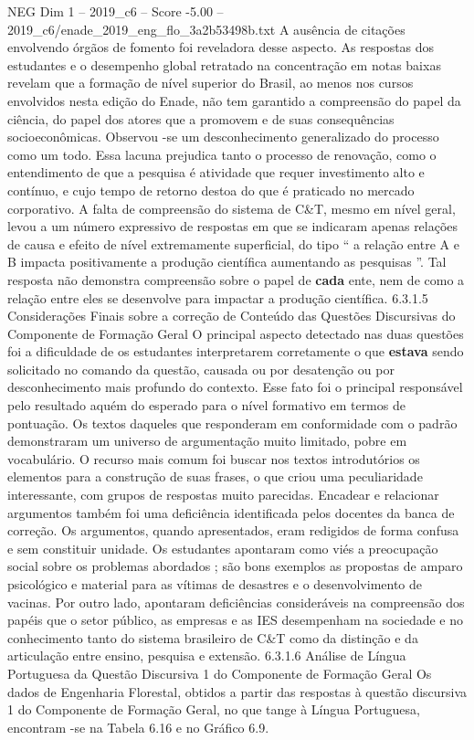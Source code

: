 \begin{textsample}{NEG Dim 1 – 2019\_c6 – Score -5.00 – 2019\_c6/enade\_2019\_eng\_flo\_3a2b53498b.txt}
A ausência de citações envolvendo órgãos de fomento foi reveladora desse aspecto.
As respostas dos estudantes e o desempenho global retratado na concentração em notas baixas revelam que a formação de nível superior do Brasil, ao menos nos cursos envolvidos nesta edição do Enade, não tem garantido a compreensão do papel da ciência, do papel dos atores que a promovem e de suas consequências socioeconômicas.
Observou -se um desconhecimento generalizado do processo como um todo.
Essa lacuna prejudica tanto o processo de renovação, como o entendimento de que a pesquisa é atividade que requer investimento alto e contínuo, e cujo tempo de retorno destoa do que é praticado no mercado corporativo.
A falta de compreensão do sistema de C\&T, mesmo em nível geral, levou a um número expressivo de respostas em que se indicaram apenas relações de causa e efeito de nível extremamente superficial, do tipo “ a relação entre A e B impacta positivamente a produção científica aumentando as pesquisas ”.
Tal resposta não demonstra compreensão sobre o papel de \textbf{cada} ente, nem de como a relação entre eles se desenvolve para impactar a produção científica. 6.3.1.5 Considerações Finais sobre a correção de Conteúdo das Questões Discursivas do Componente de Formação Geral O principal aspecto detectado nas duas questões foi a dificuldade de os estudantes interpretarem corretamente o que \textbf{estava} sendo solicitado no comando da questão, causada ou por desatenção ou por desconhecimento mais profundo do contexto.
Esse fato foi o principal responsável pelo resultado aquém do esperado para o nível formativo em termos de pontuação.
Os textos daqueles que responderam em conformidade com o padrão demonstraram um universo de argumentação muito limitado, pobre em vocabulário.
O recurso mais comum foi buscar nos textos introdutórios os elementos para a construção de suas frases, o que criou uma peculiaridade interessante, com grupos de respostas muito parecidas.
Encadear e relacionar argumentos também foi uma deficiência identificada pelos docentes da banca de correção.
Os argumentos, quando apresentados, eram redigidos de forma confusa e sem constituir unidade.
Os estudantes apontaram como viés a preocupação social sobre os problemas abordados ; são bons exemplos as propostas de amparo psicológico e material para as vítimas de desastres e o desenvolvimento de vacinas.
Por outro lado, apontaram deficiências consideráveis na compreensão dos papéis que o setor público, as empresas e as IES desempenham na sociedade e no conhecimento tanto do sistema brasileiro de C\&T como da distinção e da articulação entre ensino, pesquisa e extensão. 6.3.1.6 Análise de Língua Portuguesa da Questão Discursiva 1 do Componente de Formação Geral Os dados de Engenharia Florestal, obtidos a partir das respostas à questão discursiva 1 do Componente de Formação Geral, no que tange à Língua Portuguesa, encontram -se na Tabela 6.16 e no Gráfico 6.9.

\end{textsample}
